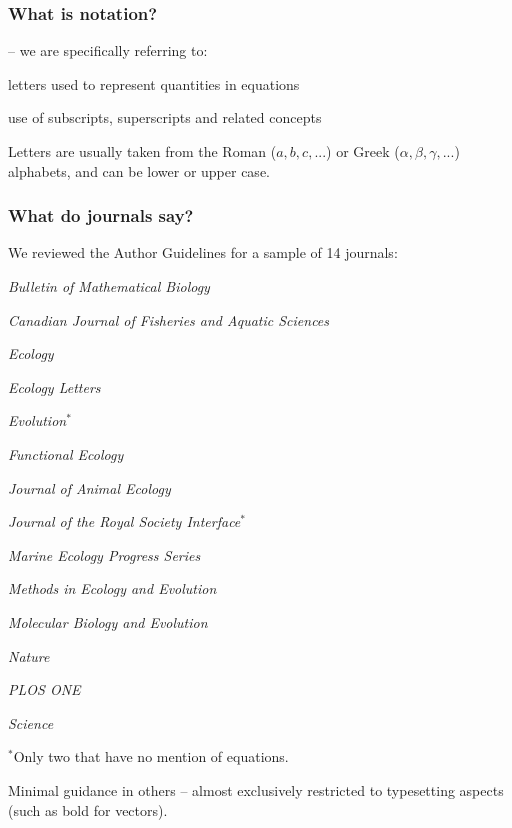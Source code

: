 
\begin{frame}
\frametitle{What is notation?}

 -- we are specifically referring to:
\bi
\item letters used to represent quantities in equations
\item use of subscripts, superscripts and related concepts
\ei

Letters are usually taken from the Roman ($a, b, c, ...$) or
Greek ($\alpha, \beta, \gamma, ...$) alphabets, and can be lower or upper case.
\end{frame}


\begin{frame}
\frametitle{What do journals say?}
We reviewed the Author Guidelines for a sample of 14 journals:
\begin{multicols}{2}
\bi
\item \emph{Bulletin of Mathematical Biology}
\item \emph{Canadian Journal of Fisheries and Aquatic Sciences}
\item \emph{Ecology}
\item \emph{Ecology Letters}
\item \emph{Evolution$^*$}
\item \emph{Functional Ecology}
\item \emph{Journal of Animal Ecology}
\item \emph{Journal of the Royal Society Interface$^*$}
\item \emph{Marine Ecology Progress Series}
\item \emph{Methods in Ecology and Evolution}
\item \emph{Molecular Biology and Evolution}
\item \emph{Nature}
\item \emph{PLOS ONE}
\item \emph{Science}
\item[\vspace{\fill}]
\ei
\end{multicols}

$^*$Only two that have no mention of equations.

Minimal guidance in others -- almost exclusively restricted to typesetting aspects
(such as bold for vectors).

\end{frame}

